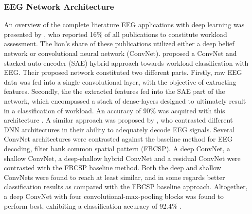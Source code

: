 \documentclass[fleqn,11pt]{paper}
\begin{document}
\subsubsection*{EEG Network Architecture}
An overview of the complete literature EEG applications with deep learning was presented by , who reported 16\% of all publications to constitute workload assessment. The lion's share of these publications utilized either a deep belief network or convolutional neural network (ConvNet).  proposed a ConvNet and stacked auto-encoder (SAE) hybrid approach towards workload classification with EEG. Their proposed network constituted two different parts. Firstly, raw EEG data was fed into a single convolutional layer, with the objective of extracting features. Secondly, the the extracted features fed into the SAE part of the network,  which encompassed a stack of dense-layers designed to ultimately result in a classification of workload.  An accuracy of 90\% was acquired with this architecture \cite{tabar2016novel}. A similar approach was proposed by , who contrasted different DNN architectures in their ability to adequately decode EEG signals. Several ConvNet architectures were contrasted against the baseline method for EEG decoding, filter bank common spatial pattern (FBCSP). A deep ConvNet, a shallow ConvNet, a deep-shallow hybrid ConvNet and a residual ConvNet were contrasted with the FBCSP baseline method. Both the deep and shallow ConvNets were found to reach at least similar, and in some regards better classification results as compared with the FBCSP baseline approach. Altogether, a deep ConvNet with four convolutional-max-pooling blocks was found to perform best, exhibiting a classification accuracy of 92.4\% \cite{schirrmeister2017deep}.
\end{document}
